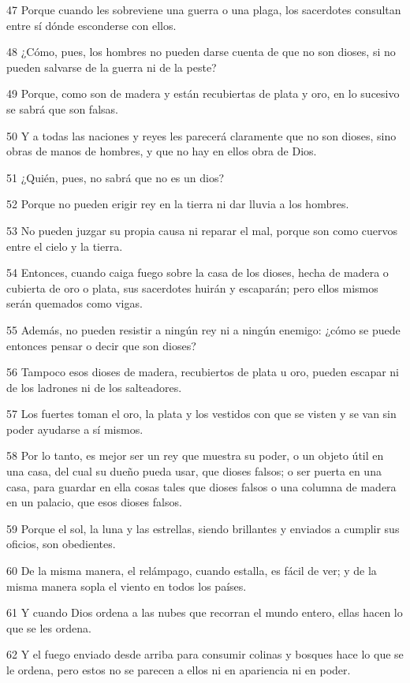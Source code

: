 \par 47 Porque cuando les sobreviene una guerra o una plaga, los sacerdotes consultan entre sí dónde esconderse con ellos.
\par 48 ¿Cómo, pues, los hombres no pueden darse cuenta de que no son dioses, si no pueden salvarse de la guerra ni de la peste?
\par 49 Porque, como son de madera y están recubiertas de plata y oro, en lo sucesivo se sabrá que son falsas.
\par 50 Y a todas las naciones y reyes les parecerá claramente que no son dioses, sino obras de manos de hombres, y que no hay en ellos obra de Dios.
\par 51 ¿Quién, pues, no sabrá que no es un dios?
\par 52 Porque no pueden erigir rey en la tierra ni dar lluvia a los hombres.
\par 53 No pueden juzgar su propia causa ni reparar el mal, porque son como cuervos entre el cielo y la tierra.
\par 54 Entonces, cuando caiga fuego sobre la casa de los dioses, hecha de madera o cubierta de oro o plata, sus sacerdotes huirán y escaparán; pero ellos mismos serán quemados como vigas.
\par 55 Además, no pueden resistir a ningún rey ni a ningún enemigo: ¿cómo se puede entonces pensar o decir que son dioses?
\par 56 Tampoco esos dioses de madera, recubiertos de plata u oro, pueden escapar ni de los ladrones ni de los salteadores.
\par 57 Los fuertes toman el oro, la plata y los vestidos con que se visten y se van sin poder ayudarse a sí mismos.
\par 58 Por lo tanto, es mejor ser un rey que muestra su poder, o un objeto útil en una casa, del cual su dueño pueda usar, que dioses falsos; o ser puerta en una casa, para guardar en ella cosas tales que dioses falsos o una columna de madera en un palacio, que esos dioses falsos.
\par 59 Porque el sol, la luna y las estrellas, siendo brillantes y enviados a cumplir sus oficios, son obedientes.
\par 60 De la misma manera, el relámpago, cuando estalla, es fácil de ver; y de la misma manera sopla el viento en todos los países.
\par 61 Y cuando Dios ordena a las nubes que recorran el mundo entero, ellas hacen lo que se les ordena.
\par 62 Y el fuego enviado desde arriba para consumir colinas y bosques hace lo que se le ordena, pero estos no se parecen a ellos ni en apariencia ni en poder.
